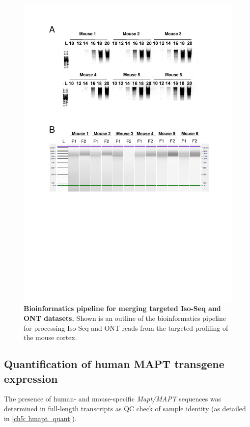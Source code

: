 \begin{figure}[htp]
	\centering
	\includegraphics[page=5,trim={0.5cm 7cm 0cm 0cm},clip,scale = 0.8]{Figures/TargetedTranscriptome_LabResults}
	\captionsetup{width=0.95\textwidth,singlelinecheck=off}
	\caption[Bioinformatics pipeline for merging targeted Iso-Seq and ONT datasets]%
	{\textbf{Bioinformatics pipeline for merging targeted Iso-Seq and ONT datasets.} Shown is an outline of the bioinformatics pipeline for processing Iso-Seq and ONT reads from the targeted profiling of the mouse cortex. 
	}
	\label{fig:Targeted_bioinformatics_pipeline}
\end{figure}

\subsection{Quantification of human MAPT transgene expression} 
The presence of human- and mouse-specific \textit{Mapt/MAPT} sequences was determined in full-length transcripts as QC check of sample identity (as detailed in \cref{ch5: hmapt_quant}). 

